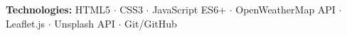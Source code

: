 \textbf{Technologies:} HTML5 $\cdot$ CSS3 $\cdot$ JavaScript ES6+ $\cdot$ OpenWeatherMap API $\cdot$ Leaflet.js $\cdot$ Unsplash API $\cdot$ Git/GitHub






% 

